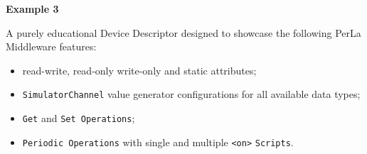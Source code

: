 \textbf{Example 3}

A purely educational Device Descriptor designed to showcase the following PerLa
Middleware features:

\begin{itemize}
    \item read-write, read-only write-only and static attributes;
    \item \texttt{SimulatorChannel} value generator configurations for all
        available data types;
    \item \texttt{Get} and \texttt{Set Operations};
    \item \texttt{Periodic Operations} with single and multiple
        \lstinline!<on>! \texttt{Scripts}.
\end{itemize}

~\\
\lstset{language=XML}
